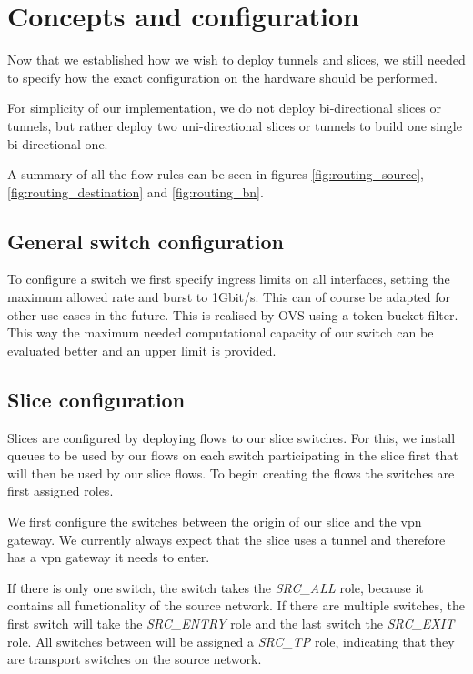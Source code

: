 \section{Concepts and configuration}
\label{impl_concepts}
Now that we established how we wish to deploy tunnels and slices, we still needed to specify how the exact configuration on the hardware should be performed.

For simplicity of our implementation, we do not deploy bi-directional slices or tunnels, but rather deploy two uni-directional slices or tunnels to build one single bi-directional one.

A summary of all the flow rules can be seen in figures \ref{fig:routing_source}, \ref{fig:routing_destination} and \ref{fig:routing_bn}.

\subsection{General switch configuration}
To configure a switch we first specify ingress limits on all interfaces, setting the maximum allowed rate and burst to 1Gbit/s. This can of course be adapted for other use cases in the future. This is realised by OVS using a token bucket filter. This way the maximum needed computational capacity of our switch can be evaluated better and an upper limit is provided.

\subsection{Slice configuration}
Slices are configured by deploying flows to our slice switches. For this, we install queues to be used by our flows on each switch participating in the slice first that will then be used by our slice flows. To begin creating the flows the switches are first assigned roles.

We first configure the switches between the origin of our slice and the \acrshort{vpn} gateway. We currently always expect that the slice uses a tunnel and therefore has a \acrshort{vpn} gateway it needs to enter.

If there is only one switch, the switch takes the \textit{SRC\_ALL} role, because it contains all functionality of the source network. If there are multiple switches, the first switch will take the \textit{SRC\_ENTRY} role and the last switch the \textit{SRC\_EXIT} role. All switches between will be assigned a \textit{SRC\_TP} role, indicating that they are transport switches on the source network.

